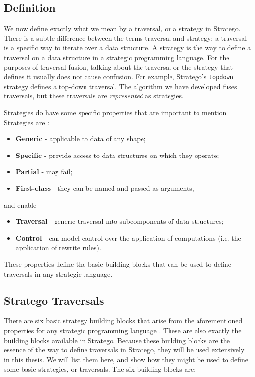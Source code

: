 \subsection{Definition}
We now define exactly what we mean by a traversal, or a strategy in Stratego. There is a subtle difference between the terms traversal and strategy: a traversal is a specific way to iterate over a data structure. A strategy is the way to define a traversal on a data structure in a strategic programming language. For the purposes of traversal fusion, talking about the traversal or the strategy that defines it usually does not cause confusion. For example, Stratego's \texttt{topdown} strategy defines a top-down traversal. The algorithm we have developed fuses traversals, but these traversals are \textit{represented} as strategies.

Strategies do have some specific properties that are important to mention. Strategies are \autocite{LaemmelVV02}: 

\begin{itemize}
    \item \textbf{Generic} - applicable to data of any shape;
    \item \textbf{Specific} - provide access to data structures on which they operate;
    \item \textbf{Partial} - may fail;
    \item \textbf{First-class} - they can be named and passed as arguments,
\end{itemize}

\noindent and enable

\begin{itemize}
    \item \textbf{Traversal} - generic traversal into subcomponents of data structures;
    \item \textbf{Control} - can model control over the application of computations (i.e. the application of rewrite rules).
\end{itemize}

These properties define the basic building blocks that can be used to define traversals in any strategic language.

\subsection{Stratego Traversals}
There are six basic strategy building blocks that arise from the aforementioned properties for any strategic programming language \autocite{LaemmelVV02}. These are also exactly the building blocks available in Stratego. Because these building blocks are the essence of the way to define traversals in Stratego, they will be used extensively in this thesis. We will list them here, and show how they might be used to define some basic strategies, or traversals. The six building blocks are:

